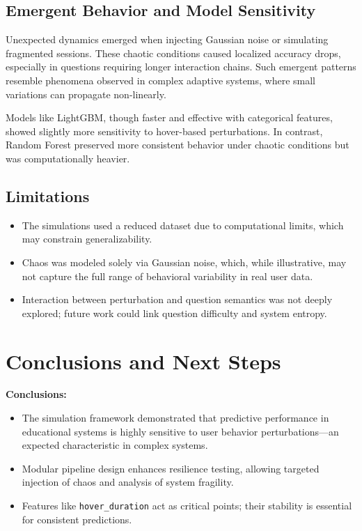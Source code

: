 \documentclass[12pt]{article}
\begin{document}
\subsection{Emergent Behavior and Model Sensitivity}

Unexpected dynamics emerged when injecting Gaussian noise or simulating fragmented sessions. These chaotic conditions caused localized accuracy drops, especially in questions requiring longer interaction chains. Such emergent patterns resemble phenomena observed in complex adaptive systems, where small variations can propagate non-linearly.

Models like LightGBM, though faster and effective with categorical features, showed slightly more sensitivity to hover-based perturbations. In contrast, Random Forest preserved more consistent behavior under chaotic conditions but was computationally heavier.

\subsection{Limitations}

\begin{itemize}
	\item The simulations used a reduced dataset due to computational limits, which may constrain generalizability.
	\item Chaos was modeled solely via Gaussian noise, which, while illustrative, may not capture the full range of behavioral variability in real user data.
	\item Interaction between perturbation and question semantics was not deeply explored; future work could link question difficulty and system entropy.
\end{itemize}
	
\section{Conclusions and Next Steps}

\textbf{Conclusions:}
\begin{itemize}
	\item The simulation framework demonstrated that predictive performance in educational systems is highly sensitive to user behavior perturbations—an expected characteristic in complex systems.
	\item Modular pipeline design enhances resilience testing, allowing targeted injection of chaos and analysis of system fragility.
	\item Features like \texttt{hover\_duration} act as critical points; their stability is essential for consistent predictions.
\end{itemize}
\end{document}
